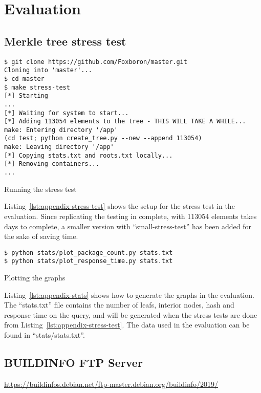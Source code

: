 \documentclass[../Main/thesis.tex]{subfiles}
\begin{document}
\chapter{Evaluation}%
\label{appendix:evaluation}

\section{Merkle tree stress test}%
\label{appendix:merkle_tree_stress_test}

\begin{listing}[H]
\begin{verbatim}
$ git clone https://github.com/Foxboron/master.git
Cloning into 'master'...
$ cd master 
$ make stress-test
[*] Starting
...
[*] Waiting for system to start...
[*] Adding 113054 elements to the tree - THIS WILL TAKE A WHILE...
make: Entering directory '/app'
(cd test; python create_tree.py --new --append 113054)
make: Leaving directory '/app'
[*] Copying stats.txt and roots.txt locally...
[*] Removing containers...
...
\end{verbatim}
\caption{Running the stress test}
\label{lst:appendix-stress-test}
\end{listing}

Listing~\ref{lst:appendix-stress-test} shows the setup for the stress test in
the evaluation. Since replicating the testing in complete, with 113054 elements
takes days to complete, a smaller version with ``small-stress-test'' has been
added for the sake of saving time.

    

\begin{listing}[H]
\begin{verbatim}
$ python stats/plot_package_count.py stats.txt
$ python stats/plot_response_time.py stats.txt
\end{verbatim}
\caption{Plotting the graphs}
\label{lst:appendix-stats}
\end{listing}

Listing~\ref{lst:appendix-stats} shows how to generate the graphs in the
evaluation. The ``stats.txt'' file contains the number of leafs, interior nodes,
hash and response time on the query, and will be generated when the stress tests
are done from Listing~\ref{lst:appendix-stress-test}. The data used in the
evaluation can be found in ``stats/stats.txt''.


\section{BUILDINFO FTP Server}%
\label{appendix:buildinfo_ftp_server}
\url{https://buildinfos.debian.net/ftp-master.debian.org/buildinfo/2019/}
\end{document}
